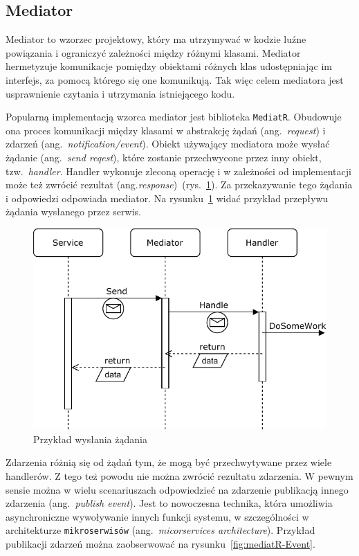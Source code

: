 \subsection{Mediator}
\label{subsec:mediator}

Mediator to wzorzec projektowy, który ma utrzymywać w kodzie luźne powiązania i ograniczyć zależności między różnymi klasami. Mediator hermetyzuje komunikacje pomiędzy obiektami różnych klas udostępniając im interfejs, za pomocą którego się one komunikują. Tak więc celem mediatora jest usprawnienie czytania i utrzymania istniejącego kodu.

Popularną implementacją wzorca mediator jest biblioteka \texttt{MediatR}. Obudowuje ona proces komunikacji między klasami w abstrakcję żądań (ang.~\emph{request}) i zdarzeń (ang.~\emph{notification/event}). Obiekt używający mediatora może wysłać żądanie (ang.~\emph{send reqest}), które zostanie przechwycone przez inny obiekt, tzw.~\emph{handler}. Handler wykonuje zleconą operację i w zależności od implementacji może też zwrócić rezultat (ang.\emph{response})~(rys.~\ref{fig:mediatR-Request}). Za przekazywanie tego żądania i odpowiedzi odpowiada mediator. Na rysunku~\ref{fig:mediatR-Request} widać przykład przepływu żądania wysłanego przez serwis.

\begin{figure}
	\centering
	\includegraphics[width=.6\linewidth]{rys02/mediatR-Command-3.pdf}
	\caption{Przykład wysłania żądania}
	\label{fig:mediatR-Request}
\end{figure}

Zdarzenia różnią się od żądań tym, że mogą być przechwytywane przez wiele handlerów. Z tego też powodu nie można zwrócić rezultatu zdarzenia. W pewnym sensie można w wielu scenariuszach odpowiedzieć na zdarzenie publikacją innego zdarzenia (ang.~\emph{publish event}). Jest to nowoczesna technika, która umożliwia asynchroniczne wywoływanie innych funkcji systemu, w szczególności w architekturze \texttt{mikroserwisów} (ang.~\emph{micorservices architecture}). Przykład publikacji zdarzeń można zaobserwować na rysunku~\ref{fig:mediatR-Event}.


